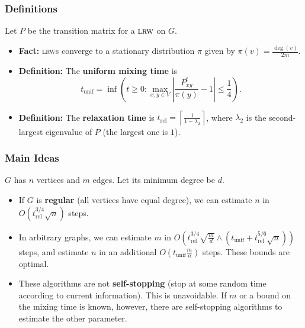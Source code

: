 \documentclass{beamer}
\begin{document}
\begin{frame}
\frametitle{Definitions}
Let $P$ be the transition matrix for a $\textsc{lrw}$ on $G$.
\begin{itemize}
    \item \textbf{Fact:} \textsc{lrw}s converge to a stationary distribution $\pi$ given by $\pi(v)=\frac{\deg(v)}{2m}$.
    \item \textbf{Definition:} The \textbf{uniform mixing time} is 
    \[t_{\text{unif}}=\inf\left(t\geq 0:\max_{x,y\in V}\left|\frac{P^t_{xy}}{\pi(y)}-1\right|\leq \frac{1}{4}\right).\]
    \item \textbf{Definition:} The \textbf{relaxation time} is $t_{\text{rel}}=\left\lceil\frac{1}{1-\lambda_2}\right\rceil$, where $\lambda_2$ is the second-largest eigenvalue of $P$ (the largest one is $1$).
\end{itemize}
\end{frame}

\begin{frame}
\frametitle{Main Ideas}
$G$ has $n$ vertices and $m$ edges. Let its minimum degree be $d$.
\begin{itemize}
    \item If $G$ is \textbf{regular} (all vertices have equal degree), we can estimate $n$ in $O(t_{\text{rel}}^{3/4}\sqrt{n})$ steps.
    \item In arbitrary graphs, we can estimate $m$ in $O\left(t_{\text{rel}}^{3/4}\sqrt{\frac{m}{d}}\wedge \left(t_{\text{unif}}+t_{\text{rel}}^{5/6}\sqrt{n}\right)\right)$ steps, and estimate $n$ in an additional $O\left(t_{\text{unif}}\frac{m}{n}\right)$ steps. These bounds are optimal.
    \item These algorithms are not \textbf{self-stopping} (stop at some random time according to current information). This is unavoidable. If $m$ or a bound on the mixing time is known, however, there are self-stopping algorithms to estimate the other parameter.
\end{itemize}
\end{frame}
\end{document}
